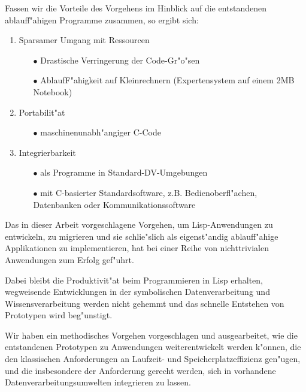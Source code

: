 Fassen wir die Vorteile des Vorgehens im Hinblick auf die entstandenen
ablauf\/f"ahigen Programme zusammen, so ergibt sich:
\begin{enumerate}
\item Sparsamer Umgang mit Ressourcen
  \begin{itemize}
   \item[$\bullet$] Drastische Verringerung der Code-Gr"o"sen
   \item[$\bullet$] Ablauf\/F"ahigkeit auf Kleinrechnern (Expertensystem
        auf einem 2MB Notebook)
  \end{itemize}
\item Portabilit"at
  \begin{itemize}
   \item[$\bullet$] maschinenunabh"angiger C-Code
  \end{itemize}
\item Integrierbarkeit
  \begin{itemize}
   \item[$\bullet$] als Programme in Standard-DV-Umgebungen
   \item[$\bullet$] mit C-basierter Standardsoftware, z.B.
                    Bedienoberfl"achen, Datenbanken oder
                    Kommunikationssoftware 
  \end{itemize}
\end{enumerate}

Das in dieser Arbeit vorgeschlagene Vorgehen, um Lisp-Anwendungen zu
entwickeln, zu migrieren und sie schlie"slich als eigenst"andig
ablauf\/f"ahige Applikationen zu implementieren, hat bei einer Reihe von
nichttrivialen Anwendungen zum Erfolg gef"uhrt.

Dabei bleibt die Produktivit"at beim Programmieren in Lisp erhalten,
wegweisende Entwicklungen in der symbolischen Datenverarbeitung und
Wissensverarbeitung werden nicht gehemmt und das schnelle 
Entstehen von Prototypen wird beg"unstigt.

Wir haben ein methodisches Vorgehen vorgeschlagen und ausgearbeitet,
wie die entstandenen Prototypen zu Anwendungen weiterentwickelt werden
k"onnen, die den klassischen Anforderungen an Laufzeit- und
Speicherplatzeffizienz gen"ugen, und die insbesondere der Anforderung
gerecht werden, sich in vorhandene Datenverarbeitungsumwelten
integrieren zu lassen.

